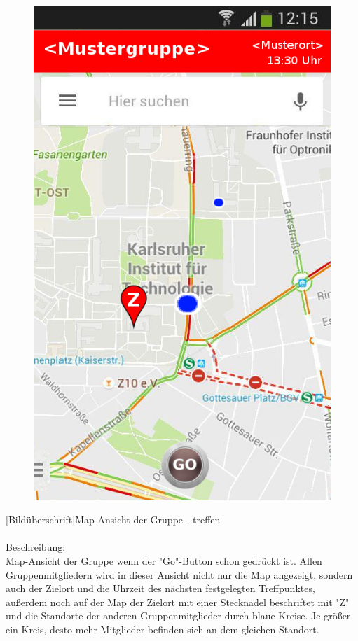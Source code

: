 \begin{figure}
	\includegraphics[scale =1]{resources/images/map_Go.png}
\end{figure}
[Bildüberschrift]Map-Ansicht der Gruppe - treffen\\ \\
[Kleinüberschrift]Beschreibung:\\
Map-Ansicht der Gruppe wenn der "Go"-Button schon gedrückt ist. Allen Gruppenmitgliedern wird in dieser Ansicht nicht nur die Map angezeigt, sondern auch der Zielort und die Uhrzeit des nächsten festgelegten Treffpunktes, außerdem noch auf der Map der Zielort mit einer Stecknadel beschriftet mit "Z" und die Standorte der anderen Gruppenmitglieder durch blaue Kreise. Je größer ein Kreis, desto mehr Mitglieder befinden sich an dem gleichen Standort.\\
